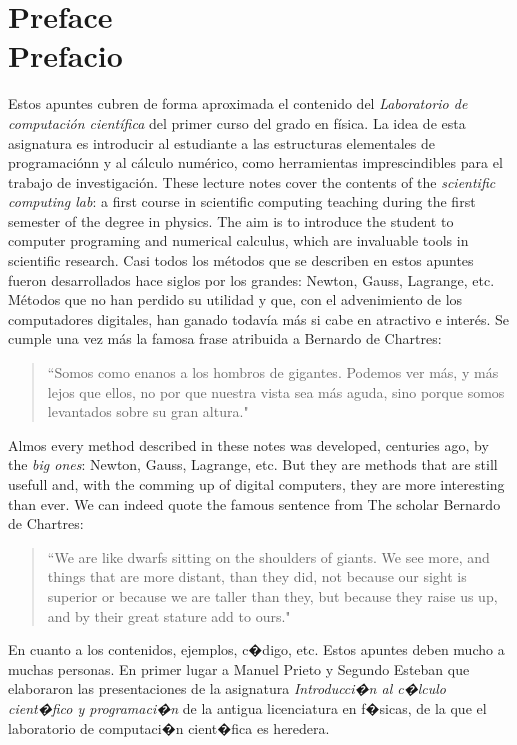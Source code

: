 \chapter*{Preface\\ Prefacio}
\begin{paracol}{2}
Estos apuntes cubren de forma aproximada  el contenido del \emph{Laboratorio de computación científica} del primer curso del grado en física.
La idea de esta asignatura es  introducir al estudiante a las estructuras elementales de programaciónn y al cálculo numérico, como herramientas imprescindibles para el trabajo de investigación.
\switchcolumn
These lecture notes cover the contents  of the \emph{scientific computing lab}: a first course in scientific computing teaching during the first semester of the degree in physics. The aim is to introduce the student to computer programing and numerical calculus, which are invaluable tools in scientific research.
\switchcolumn         
Casi todos los métodos que se describen en estos apuntes fueron desarrollados hace siglos por los grandes: Newton, Gauss, Lagrange, etc.  Métodos que no han perdido su utilidad y que, con el advenimiento de los computadores digitales, han ganado todavía más si cabe en atractivo e interés. Se cumple una vez más la famosa frase atribuida a Bernardo de Chartres:
\begin{quote}
``Somos como enanos a los hombros de gigantes. Podemos ver más, y más lejos que ellos, no por que nuestra vista sea más aguda, sino porque somos levantados sobre su gran altura."
\end{quote}
\switchcolumn
Almos every method described in these notes was developed, centuries ago, by the \emph{big ones}: Newton, Gauss, Lagrange, etc. But they are methods that are still usefull and, with the comming up of digital computers, they are more interesting than ever. We can indeed quote the famous sentence from The scholar Bernardo de Chartres:
\begin{quote}
``We are like dwarfs sitting on the shoulders of giants. We see more, and things that are more distant, than they did, not because our sight is superior or because we are taller than they, but because they raise us up, and by their great stature add to ours."
\end{quote}          

\switchcolumn
En cuanto a los contenidos, ejemplos, c�digo, etc. Estos apuntes deben mucho a muchas personas. En primer lugar a Manuel Prieto y Segundo Esteban que elaboraron las presentaciones de la asignatura \emph{Introducci�n al c�lculo cient�fico y programaci�n} de la antigua licenciatura en f�sicas, de la que el laboratorio de computaci�n cient�fica es heredera. 


\end{paracol}
